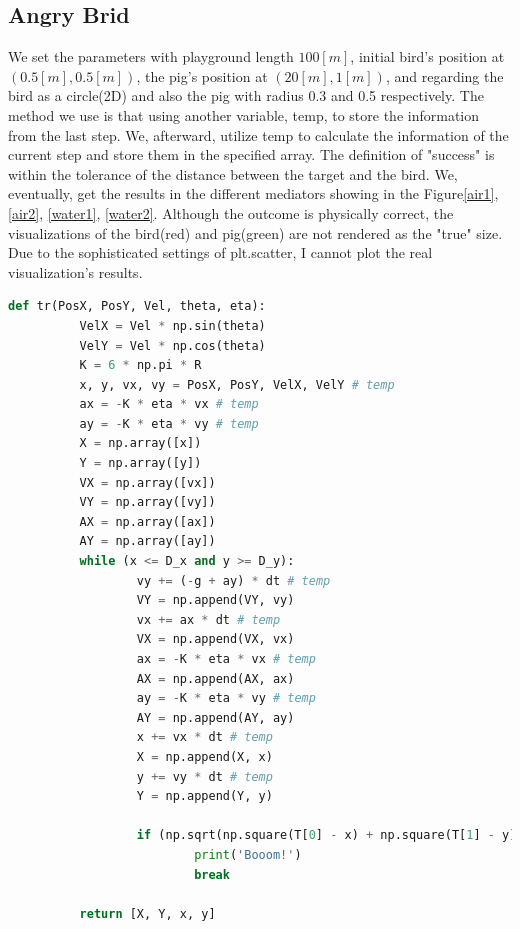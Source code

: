 \documentclass[12pt]{article}
\begin{document}
  \subsection{Angry Brid}
    We set the parameters with playground length $100 [m]$, initial bird's position at $(0.5[m], 0.5[m])$, the pig's position at $(20[m], 1[m])$, and regarding the bird as a circle(2D) and also the pig with radius 0.3 and 0.5 respectively. The method we use is that using another variable, temp, to store the information from the last step. We, afterward, utilize temp to calculate the information of the current step and store them in the specified array. The definition of "success" is within the tolerance of the distance between the target and the bird. We, eventually, get the results in the different mediators showing in the Figure\ref{air1}, \ref{air2}, \ref{water1}, \ref{water2}. Although the outcome is physically correct, the visualizations of the bird(red) and pig(green) are not rendered as the "true" size. Due to the sophisticated settings of {\ttfamily plt.scatter}, I cannot plot the real visualization's results.

    \begin{lstlisting}[language={Python}, caption={This is the algorithm of the simulations of Angry Bird with different circumstances.}]
      def tr(PosX, PosY, Vel, theta, eta):
          VelX = Vel * np.sin(theta)
          VelY = Vel * np.cos(theta)
          K = 6 * np.pi * R
          x, y, vx, vy = PosX, PosY, VelX, VelY # temp
          ax = -K * eta * vx # temp
          ay = -K * eta * vy # temp
          X = np.array([x])
          Y = np.array([y])
          VX = np.array([vx])
          VY = np.array([vy])
          AX = np.array([ax])
          AY = np.array([ay])
          while (x <= D_x and y >= D_y):
                  vy += (-g + ay) * dt # temp
                  VY = np.append(VY, vy)
                  vx += ax * dt # temp
                  VX = np.append(VX, vx)
                  ax = -K * eta * vx # temp
                  AX = np.append(AX, ax)
                  ay = -K * eta * vy # temp
                  AY = np.append(AY, ay)
                  x += vx * dt # temp
                  X = np.append(X, x)
                  y += vy * dt # temp
                  Y = np.append(Y, y)
                  
                  if (np.sqrt(np.square(T[0] - x) + np.square(T[1] - y)) <= PosSec):
                          print('Booom!')
                          break
                  
          return [X, Y, x, y]
    \end{lstlisting}
\end{document}
